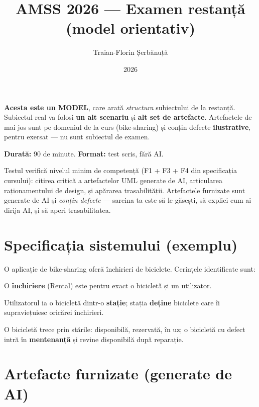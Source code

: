 \documentclass[12pt,a4paper]{article}
\title{AMSS 2026 — Examen restanță \\ \large (model orientativ)}
\author{Traian-Florin Șerbănuță}
\date{2026}
\begin{document}
\maketitle

\begin{framed}
\noindent\textbf{Acesta este un MODEL}, care arată \emph{structura}
subiectului de la restanță. Subiectul real va folosi \textbf{un alt
scenariu} și \textbf{alt set de artefacte}. Artefactele de mai jos sunt
pe domeniul de la curs (bike-sharing) și conțin defecte
\textbf{ilustrative}, pentru exersat — nu sunt subiectul de examen.
\end{framed}

\bigskip

\textbf{Durată:} 90 de minute. \textbf{Format:} test scris, fără AI.

\noindent Testul verifică nivelul minim de competență
(F1 + F3 + F4 din specificația cursului): citirea critică a
artefactelor UML generate de AI, articularea raționamentului de design,
și apărarea trasabilității. Artefactele furnizate sunt generate de AI și
\emph{conțin defecte} — sarcina ta este să le găsești, să explici cum ai
dirija AI, și să aperi trasabilitatea.

\section*{Specificația sistemului (exemplu)}

O aplicație de bike-sharing oferă închirieri de biciclete. Cerințele
identificate sunt:

\begin{description}[leftmargin=3.2em,style=nextline]
  \item[R1] O \textbf{închiriere} (Rental) este pentru exact o bicicletă
        și un utilizator.
  \item[R2] Utilizatorul ia o bicicletă dintr-o \textbf{stație}; stația
        \textbf{deține} biciclete care îi supraviețuiesc oricărei
        închirieri.
  \item[R3] O bicicletă trece prin stările: disponibilă, rezervată, în
        uz; o bicicletă cu defect intră în \textbf{mentenanță} și revine
        disponibilă după reparație.
\end{description}

\section*{Artefacte furnizate (generate de AI)}
\end{document}
